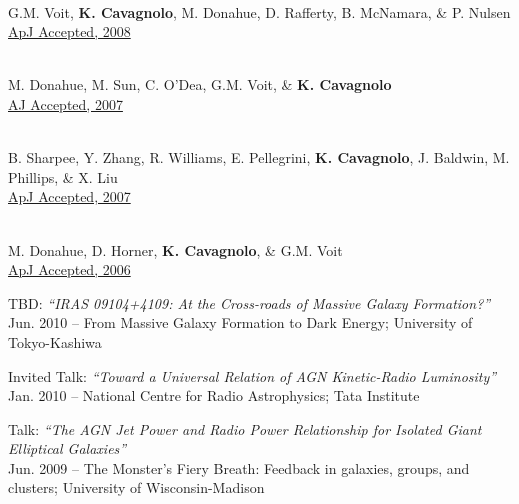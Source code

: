 \documentclass[12pt]{cv}
\begin{document}
\begin{llist}
{}\\
G.M. Voit, {\bf K. Cavagnolo}, M. Donahue, D. Rafferty, B. McNamara, \& P. Nulsen\\
\href{http://adsabs.harvard.edu/abs/2008ApJ...681L...5V}{ApJ Accepted, 2008}

{}\\
M. Donahue, M. Sun, C. O'Dea, G.M. Voit, \& {\bf K. Cavagnolo}\\
\href{http://adsabs.harvard.edu/abs/2007AJ....134...14D}{AJ Accepted, 2007}

{}\\
B. Sharpee, Y. Zhang, R. Williams, E. Pellegrini, {\bf K. Cavagnolo}, J. Baldwin, M. Phillips, \& X. Liu\\
\href{http://adsabs.harvard.edu/abs/2007ApJ...659.1265S}{ApJ Accepted, 2007}

{}\\
M. Donahue, D. Horner, {\bf K. Cavagnolo}, \& G.M. Voit\\
\href{http://adsabs.harvard.edu/abs/2006ApJ...643..730D}{ApJ Accepted, 2006}




{\sc TBD: {\textit{``IRAS 09104+4109: At the Cross-roads of Massive Galaxy Formation?''}}}\\
Jun. 2010 -- From Massive Galaxy Formation to Dark Energy; University of Tokyo-Kashiwa

{\sc Invited Talk: {\textit{``Toward a Universal Relation of AGN Kinetic-Radio Luminosity''}}}\\
Jan. 2010 -- National Centre for Radio Astrophysics; Tata Institute

{\sc Talk: {\textit{``The AGN Jet Power and Radio Power Relationship for Isolated Giant Elliptical Galaxies''}}}\\
Jun. 2009 -- The Monster's Fiery Breath: Feedback in galaxies, groups, and clusters; University of Wisconsin-Madison


\end{llist}
\end{document}
